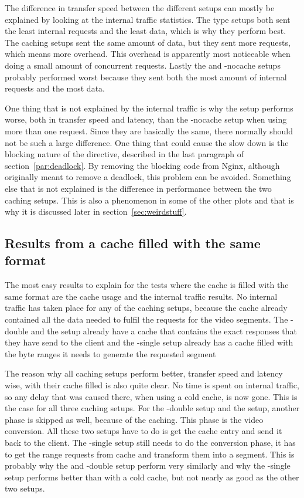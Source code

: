 \documentclass[twoside,openright]{uva-bachelor-thesis}
\begin{document}
The difference in transfer speed between the different setups can mostly be
explained by looking at the internal traffic statistics. The \cdn type setups
both sent the least internal requests and the least data, which is why they
perform best. The caching \lt setups sent the same amount of data, but they sent
more requests, which means more overhead. This overhead is apparently most
noticeable when doing a small amount of concurrent requests. Lastly the \ipp and
\lt-nocache setups probably performed worst because they sent both the most
amount of internal requests and the most data.

One thing that is not explained by the internal traffic is why the \ipp setup
performs worse, both in transfer speed and latency, than the \lt-nocache setup
when using more than one request.  Since they are basically the same, there
normally should not be such a large difference. One thing that could cause the
slow down is the blocking nature of the \ipp directive, described in the last
paragraph of section~\ref{par:deadlock}. By removing the blocking code from
Nginx, although originally meant to remove a deadlock, this problem can be
avoided. Something else that is not explained is the difference in performance
between the two caching \lt setups. This is also a phenomenon in some of the
other plots and that is why it is discussed later in
section~\ref{sec:weirdstuff}.


\subsection{Results from a cache filled with the same
format}\label{sec:discusssame}
The most easy results to explain for the tests where the cache is filled with
the same format are the cache usage and the internal traffic results. No
internal traffic has taken place for any of the caching setups, because the
cache already contained all the data needed to fulfil the requests for the video
segments. The \lt-double and the \cdn setup already have a cache that contains
the exact responses that they have send to the client and the \lt-single setup
already has a cache filled with the byte ranges it needs to generate the
requested segment

The reason why all caching setups perform better, transfer speed and latency
wise, with their cache filled is also quite clear. No time is spent on internal
traffic, so any delay that was caused there, when using a cold cache, is now gone.
This is the case for all three caching setups. For the \lt-double setup and
the \cdn setup, another phase is skipped as well, because of the caching. This
phase is the video conversion. All these two setups have to do is get the cache
entry and send it back to the client. The \lt-single setup still needs to do the
conversion phase, it has to get the range requests from cache and transform them
into a segment. This is probably why the \cdn and \lt-double setup perform very
similarly and why the \lt-single setup performs better than with a cold cache, but
not nearly as good as the other two setups.
\end{document}
